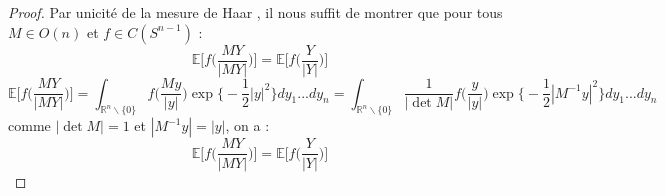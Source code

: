 \documentclass[12pt]{article}
\theoremstyle{definition}
\begin{document}
\begin{proof}
	Par unicité de la mesure de Haar , il nous suffit de montrer que pour tous $M\in O(n)$ et $f\in C(S^{n-1})$ :
	\begin{equation*}
	\mathbb{E}\Bigg[f\Big(\frac{MY}{|MY|}\Big)\Bigg]=\mathbb{E}\Bigg[f\Big(\frac{Y}{|Y|}\Big)\Bigg]
	\end{equation*}
	\begin{equation*}
	\mathbb{E}\Bigg[f\Big(\frac{MY}{|MY|}\Big)\Bigg] = \int_{\mathbb{R}^n\backslash\{0\}} f\big(\frac{My}{|y|}\big)\exp\Big\{-\frac{1}{2}|y|^2\Big\}dy_1...dy_n=\int_{\mathbb{R}^n\backslash\{0\}} \frac{1}{|\det M|}f\big(\frac{y}{|y|}\big) \exp\Big\{-\frac{1}{2}|M^{-1}y|^2\Big\}dy_1...dy_n
	\end{equation*}
	comme $|\det M|=1$ et $|M^{-1}y|=|y|$, on a : 
	\begin{equation*}
	\mathbb{E}\Bigg[f\Big(\frac{MY}{|MY|}\Big)\Bigg] = \mathbb{E}\Bigg[f\Big(\frac{Y}{|Y|}\Big)\Bigg]
	\end{equation*}
\end{proof}
\end{document}
